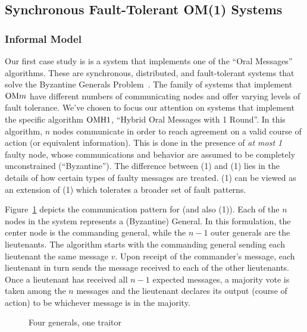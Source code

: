 \subsection{Synchronous Fault-Tolerant OM(1) Systems}
\label{ssec:synchronous-om1}

\subsubsection{Informal Model}
Our first case study is is a system that implements one of the ``Oral Messages''
algorithms. These are synchronous, distributed, and fault-tolerant systems that
solve the Byzantine Generals Problem~\cite{Lamport-OM}. The family of systems
that implement $\mathrm{OM}{m}$ have different numbers of communicating nodes and
offer varying levels of fault tolerance. We've chosen to focus our attention
on systems that implement the specific algorithm $\mathrm{OMH}{1}$, ``Hybrid Oral
Messages with 1 Round''.  In this algorithm, $n$ nodes communicate in order to
reach agreement on a valid course of action (or equivalent information). This
is done in the presence of \emph{at most 1} faulty node, whose communications
and behavior are assumed to be completely unconstrained (``Byzantine''). The
difference between \OM(1) and \OMH(1) lies in the details of how certain types
of faulty messages are treated. \OMH(1) can be viewed as an extension of
\OM(1) which tolerates a broader set of fault patterns.

Figure~\ref{fig:om1} depicts the communication pattern for  (and also
\OMH(1)). Each of the $n$ nodes in the system represents a (Byzantine)
General. In this formulation, the center node is the commanding general, while
the $n-1$ outer generals are the lieutenants. The algorithm starts with the
commanding general sending each lieutenant the same message $v$. Upon receipt
of the commander's message, each lieutenant in turn sends the message received
to each of the other lieutenants.  Once a lieutenant has received all $n-1$
expected messages, a majority vote is taken among the $n$ messages and the
lieutenant declares its output (course of action) to be whichever message is
in the majority.

\begin{figure}[ht]
\centering
{}
\caption{ Four generals, one traitor}
\label{fig:om1}
\end{figure}

